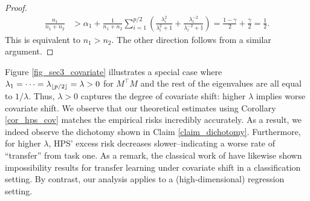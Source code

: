 \begin{proof}
    \begin{align*}
     \frac{n_1}{n_1 + n_2} &> \alpha_1 + \frac{1}{n_1+n_2} \sum_{i=1}^{p/2}\left(\frac{\lambda_i^2}{\lambda_i^2+1}+\frac{\lambda_i^{-2}}{\lambda_i^{-2}+1}\right) = \frac{1-\gamma}{2}+\frac{\gamma}{2}=\frac{1}{2}.
    \end{align*}
    This is equivalent to $n_1>n_2$. The other direction follows from a similar argument. %
\end{proof}

Figure \ref{fig_sec3_covariate} illustrates a special case where $\lambda_1 = \cdots = \lambda_{\lfloor {p /2} \rfloor} = \lambda > 0$ for $M^{\top}M$ and the rest of the eigenvalues are all equal to $1 / \lambda$.
Thus, $\lambda > 0$ captures the degree of covariate shift: higher $\lambda$ implies worse covariate shift.
We observe that our theoretical estimates using Corollary \ref{cor_hps_cov} matches the empirical risks incredibly accurately.
As a result, we indeed observe the dichotomy shown in Claim \ref{claim_dichotomy}.
Furthermore, for higher $\lambda$, HPS' excess risk decreases slower--indicating a worse rate of ``transfer'' from task one. 
As a remark, the classical work of \citet{david2010impossibility} have likewise shown impossibility results for transfer learning under covariate shift in a classification setting.
By contrast, our analysis applies to a (high-dimensional) regression setting.


